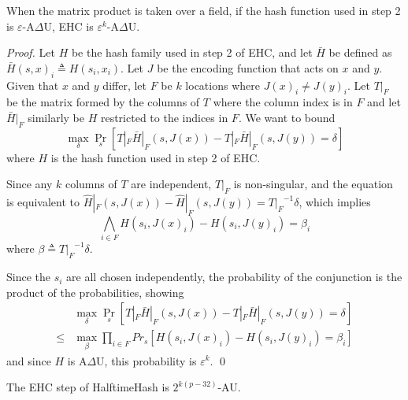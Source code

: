 \documentclass[runningheads]{llncs}
\begin{document}
\begin{lemma}
  When the matrix product is taken over a field, if the hash function used in step 2 is $\varepsilon$-A$\Delta$U, EHC is $\varepsilon^k$-A$\Delta$U.
\end{lemma}
\begin{proof}
  Let $H$ be the hash family used in step 2 of EHC, and let $\bar{H}$ be defined as $\bar{H}(s, x)_i \triangleq H(s_i, x_i)$.
  Let $J$ be the encoding function that acts on $x$ and $y$.
  Given that $x$ and $y$ differ, let $F$ be $k$ locations where $J(x)_i \neq J(y)_i$.
  Let $T|_F$ be the matrix formed by the columns of $T$ where the column index is in $F$ and let $\bar{H}|_F$ similarly be $H$ restricted to the indices in $F$.
  We want to bound
  \begin{equation}
    \label{ehc-delta}
    \max_\delta \Pr_s[T|_F \bar{H}|_F(s, J(x)) - T|_F \bar{H}|_F(s, J(y)) = \delta]
  \end{equation}
  where $H$ is the hash function used in step 2 of EHC.

  Since any $k$ columns of $T$ are independent, $T|_F$ is non-singular, and the equation is equivalent to $\hat{H}|_F(s, J(x)) - \hat{H}|_F(s, J(y)) = {T|_F}^{-1} \delta$, which implies
  \[
  \bigwedge_{i \in F} H(s_i, J(x)_i) - H(s_i, J(y)_i) = \beta_i
  \]
  where $\beta \triangleq {T|_F}^{-1} \delta$.

  Since the $s_i$ are all chosen independently, the probability of the conjunction is the product of the probabilities, showing
  \[
  \begin{array}{rl}
    & \max_\delta \Pr_s[T|_F \bar{H}|_F (s,J(x)) - T|_F \bar{H}|_F(s,J(y)) = \delta] \\
  \leq & \max_\beta \prod_{i \in F} Pr_s[H(s_i, J(x)_i) - H(s_i, J(y)_i) = \beta_i]
  \end{array}
  \]
  and since $H$ is A$\Delta$U, this probability is $\varepsilon^k$.  \qed
\end{proof}

\begin{theorem}
  The EHC step of HalftimeHash is $2^{k(p-32)}$-AU.
\end{theorem}
\end{document}
